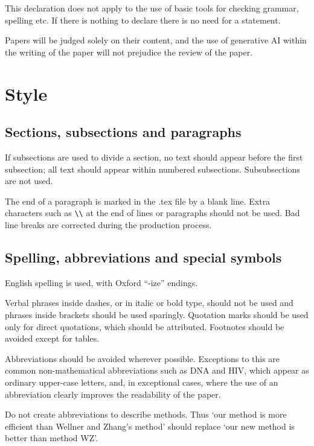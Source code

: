 \documentclass[lineno]{biometrika}
\begin{document}
This declaration does not apply to the use of basic tools for checking grammar, spelling etc. If there is nothing to declare there is no need for a statement.
 
Papers will be judged solely on their content, and the use of generative AI within the writing of the paper will not prejudice the review of the paper.



\section{Style}

\subsection{Sections, subsections and paragraphs}

If subsections are used to divide a section, no text should appear before the first subsection; all text should appear within numbered subsections.  Subsubsections are not used.

The end of a paragraph is marked in the .tex file by a blank line.  Extra characters such as \verb+\\+ at the end of lines or paragraphs should not be used.  Bad line breaks are corrected during the production process.

\subsection{Spelling, abbreviations and special symbols}

English spelling is used, with Oxford ``-ize'' endings.

Verbal phrases inside dashes, or in italic or bold type, should not be used  and phrases inside brackets should be used sparingly. Quotation marks should be used only for direct quotations, which should be attributed. Footnotes should be avoided except for tables.

Abbreviations should be avoided wherever possible.  Exceptions to this are common non-mathematical abbreviations such as DNA and HIV, which appear as ordinary upper-case letters, and, in exceptional cases, where the use of an abbreviation clearly improves the readability of the paper.

Do not create abbreviations to describe methods. Thus `our method is more efficient than Wellner and Zhang's method' should replace `our new method is better than method WZ'.
\end{document}
